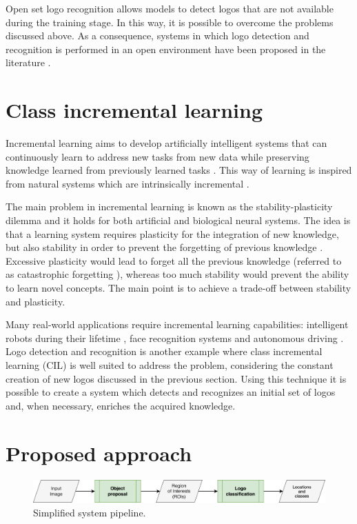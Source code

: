 Open set logo recognition allows models to
detect logos that are not available during the training stage. In this way, it is possible to overcome the problems discussed above. As a consequence, systems in which logo detection and recognition is performed in an open environment have been proposed in the literature \cite{fehervari2019scalable, li2022seetek}.

\section{Class incremental learning}
Incremental learning aims to develop artificially intelligent
systems that can continuously learn to address new tasks
from new data while preserving knowledge learned from
previously learned tasks \cite{masana2020class}. This way of learning is inspired from natural systems which are intrinsically incremental \cite{wu2019large}.

The main problem in incremental learning is known as the stability-plasticity dilemma and it holds for both artificial and biological neural systems. The idea is that a learning system requires plasticity for the integration of new knowledge, but also stability in order to prevent the forgetting of previous knowledge \cite{mermillod2013stability}. Excessive plasticity would lead to forget all the previous knowledge (referred to as catastrophic forgetting \cite{grossberg2013adaptive}), whereas too much stability would prevent the ability to learn novel concepts. The main point is to achieve a trade-off between stability and plasticity. 

Many real-world applications require incremental learning capabilities: intelligent robots during their lifetime \cite{thrun1995lifelong}, face recognition systems \cite{li2017incremental} and autonomous driving \cite{pierre2018incremental}. Logo detection and recognition is another example where class incremental learning (CIL) is well suited to address the problem, considering the constant creation of new logos discussed in the previous section. Using this technique it is possible to create a system which detects and recognizes an initial set of logos and, when necessary, enriches the acquired knowledge.

\section{Proposed approach}

\begin{figure}
    \begin{center}
        \includegraphics[width=\columnwidth]{images/pipeline.drawio.png}
    \end{center}
    \caption{Simplified system pipeline.}
    \label{fig:system-pipeline}
\end{figure}


